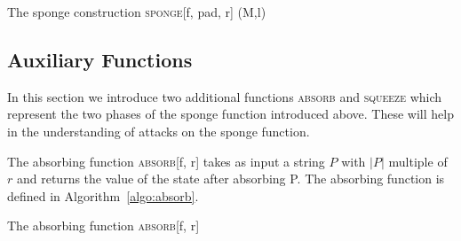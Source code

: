 \begin{algorithm}[H]
\caption{The sponge construction \textsc{sponge}[f, pad, r] (M,l)}
\label{algo:sponge}

\begin{algorithmic}[1]



\EndFor{}


\EndWhile{}

\end{algorithmic}
\end{algorithm}


\subsection{Auxiliary Functions}\label{section:aux}
In this section we introduce two additional functions \textsc{absorb} and \textsc{squeeze} which represent the two phases of the sponge function introduced above. These will help in the understanding of attacks on the sponge function.


The absorbing function \textsc{absorb}[f, r] takes as input a string $P$ with $\vert P\vert$ multiple of $r$ and returns the value of the state after absorbing P. The absorbing function is defined in Algorithm~\ref{algo:absorb}.

\begin{algorithm}[H]
\caption{The absorbing function \textsc{absorb}[f, r]}
\label{algo:absorb}
\begin{algorithmic}[1]


\EndFor{}

\end{algorithmic}
\end{algorithm}

